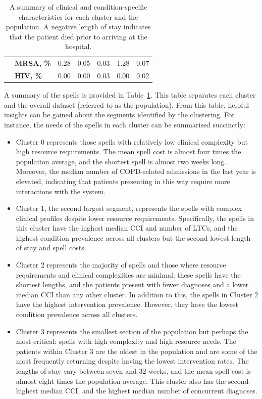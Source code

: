\begin{table}
{\begin{tabular}{llrrrrr}
               & \textbf{MRSA, \%} &     0.28 &     0.05 &     0.03 &      1.28 &       0.07 \\
               & \textbf{HIV, \%} &     0.00 &     0.00 &     0.03 &      0.00 &       0.02 \\
        \bottomrule
        \end{tabular}
    }\caption{%
        A summary of clinical and condition-specific characteristics for each
        cluster and the population. A negative length of stay indicates that the
        patient died prior to arriving at the hospital.
    }\label{tab:summary}
\end{table}

A summary of the spells is provided in Table~\ref{tab:summary}. This table
separates each cluster and the overall dataset (referred to as the population).
From this table, helpful insights can be gained about the segments identified by
the clustering. For instance, the needs of the spells in each cluster can be
summarised succinctly:
\begin{itemize}
    \item Cluster 0 represents those spells with relatively low clinical
        complexity but high resource requirements. The mean spell cost is almost
        four times the population average, and the shortest spell is almost two
        weeks long. Moreover, the median number of COPD-related admissions in
        the last year is elevated, indicating that patients presenting in this
        way require more interactions with the system.
    \item Cluster 1, the second-largest segment, represents the spells with
        complex clinical profiles despite lower resource requirements.
        Specifically, the spells in this cluster have the highest median CCI and
        number of LTCs, and the highest condition prevalence across all clusters
        but the second-lowest length of stay and spell costs.
    \item Cluster 2 represents the majority of spells and those where resource
        requirements and clinical complexities are minimal; these spells have
        the shortest lengths, and the patients present with fewer diagnoses and
        a lower median CCI than any other cluster. In addition to this, the
        spells in Cluster 2 have the highest intervention prevalence. However,
        they have the lowest condition prevalence across all clusters.
    \item Cluster 3 represents the smallest section of the population but
        perhaps the most critical: spells with high complexity and high resource
        needs. The patients within Cluster 3 are the oldest in the population
        and are some of the most frequently returning despite having the lowest
        intervention rates. The lengths of stay vary between seven and 32 weeks,
        and the mean spell cost is almost eight times the population average.
        This cluster also has the second-highest median CCI, and the highest
        median number of concurrent diagnoses.
\end{itemize}

